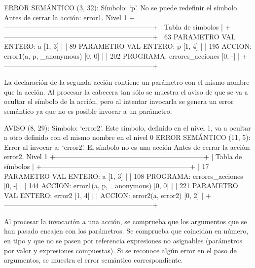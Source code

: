 \begin{codigo}
ERROR SEMÁNTICO (3, 32): Símbolo: `p'. No se puede redefinir el símbolo
Antes de cerrar la acción: error1. Nivel 1
+-----------------------------------------------------------------+
| Tabla de símbolos                                                      |
+-----------------------------------------------------------------+
|    63  PARAMETRO VAL ENTERO:     a [1, 3]                              |
|    89  PARAMETRO VAL ENTERO:     p [1, 4]                              |
|   195  ACCION:                   error1(a, p, _anonymous) [0, 0]       |
|   202  PROGRAMA:                 errores_acciones [0, -]               |
+-----------------------------------------------------------------+
\end{codigo}

La declaración de la segunda acción contiene un parámetro con el mismo nombre que la acción. Al procesar la cabecera tan sólo se muestra el aviso de que se va a ocultar el símbolo de la acción, pero al intentar invocarla se genera un error semántico ya que no es posible invocar a un parámetro.

\begin{codigo}
AVISO (8, 29): Símbolo: `error2'. Este símbolo, definido en el nivel 1, va a ocultar a otro definido con el mismo nombre en el nivel 0
ERROR SEMÁNTICO (11, 5): Error al invocar a: `error2'. El símbolo no es una acción
Antes de cerrar la acción: error2. Nivel 1
+-----------------------------------------------------------------+
| Tabla de símbolos                                                      |
+-----------------------------------------------------------------+
|    17  PARAMETRO VAL ENTERO:     a [1, 3]                              |
|   108  PROGRAMA:                 errores_acciones [0, -]               |
|   144  ACCION:                   error1(a, p, _anonymous) [0, 0]       |
|   221  PARAMETRO VAL ENTERO:     error2 [1, 4]                         |
|        ACCION:                   error2(a, error2) [0, 2]              |
+-----------------------------------------------------------------+
\end{codigo}

Al procesar la invocación a una acción, se comprueba que los argumentos que se han pasado encajen con los parámetros. Se comprueba que coincidan en número, en tipo y que no se pasen por referencia expresiones no asignables (parámetros por valor y expresiones compuestas). Si se reconoce algún error en el paso de argumentos, se muestra el error semántico correspondiente.


